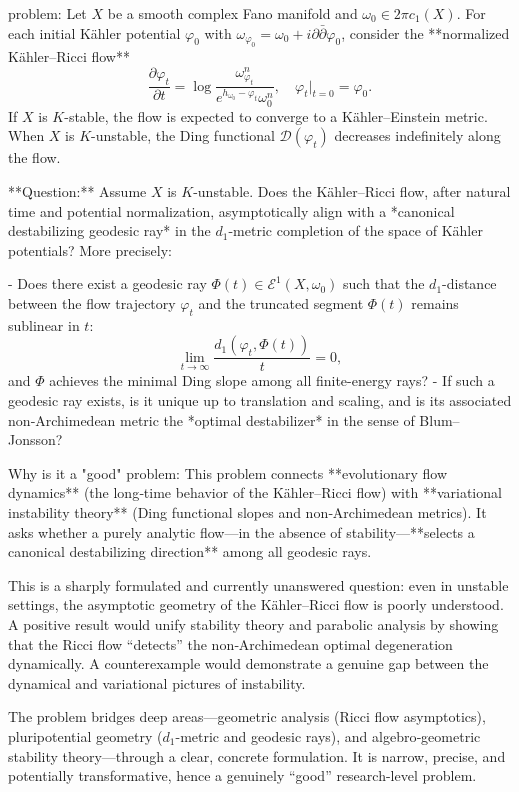 problem:  
Let \(X\) be a smooth complex Fano manifold and \( \omega_0 \in 2\pi c_1(X) \).  
For each initial Kähler potential \( \varphi_0 \) with \( \omega_{\varphi_0} = \omega_0 + i\partial\bar{\partial}\varphi_0 \), consider the **normalized Kähler–Ricci flow**
\[
\frac{\partial \varphi_t}{\partial t} = \log \frac{ \omega_{\varphi_t}^n }{ e^{h_{\omega_0}-\varphi_t}\omega_0^n }, 
\quad \varphi_t|_{t=0} = \varphi_0.
\]
If \(X\) is \(K\)-stable, the flow is expected to converge to a Kähler–Einstein metric.  
When \(X\) is \(K\)-unstable, the Ding functional \( \mathcal{D}(\varphi_t) \) decreases indefinitely along the flow.

**Question:**  
Assume \(X\) is \(K\)-unstable.  
Does the Kähler–Ricci flow, after natural time and potential normalization, asymptotically align with a *canonical destabilizing geodesic ray* in the \(d_1\)-metric completion of the space of Kähler potentials?  
More precisely:  

- Does there exist a geodesic ray \( \Phi(t) \in \mathcal{E}^1(X,\omega_0) \) such that the \(d_1\)-distance between the flow trajectory \( \varphi_t \) and the truncated segment \( \Phi(t) \) remains sublinear in \(t\):  
  \[
  \lim_{t\to\infty} \frac{d_1(\varphi_t, \Phi(t))}{t} = 0,
  \]
  and \( \Phi \) achieves the minimal Ding slope among all finite-energy rays?  
- If such a geodesic ray exists, is it unique up to translation and scaling, and is its associated non‑Archimedean metric the *optimal destabilizer* in the sense of Blum–Jonsson?  

Why is it a "good" problem:  
This problem connects **evolutionary flow dynamics** (the long‑time behavior of the Kähler–Ricci flow) with **variational instability theory** (Ding functional slopes and non‑Archimedean metrics).  
It asks whether a purely analytic flow—in the absence of stability—**selects a canonical destabilizing direction** among all geodesic rays.  

This is a sharply formulated and currently unanswered question: even in unstable settings, the asymptotic geometry of the Kähler–Ricci flow is poorly understood.  
A positive result would unify stability theory and parabolic analysis by showing that the Ricci flow “detects” the non‑Archimedean optimal degeneration dynamically.  
A counterexample would demonstrate a genuine gap between the dynamical and variational pictures of instability.  

The problem bridges deep areas—geometric analysis (Ricci flow asymptotics), pluripotential geometry (\(d_1\)-metric and geodesic rays), and algebro‑geometric stability theory—through a clear, concrete formulation.  
It is narrow, precise, and potentially transformative, hence a genuinely “good” research-level problem.